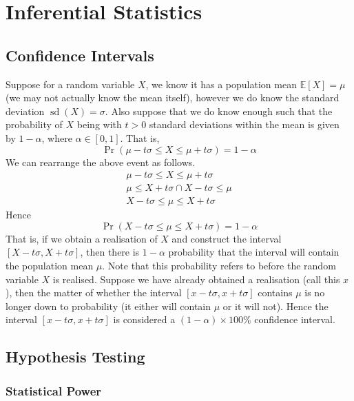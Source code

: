\documentclass[11pt]{report} %
\begin{document}
\section{Inferential Statistics}

\subsection{Confidence Intervals}

Suppose for a random variable $X$, we know it has a population mean $\mathbb{E}\left[X\right] = \mu$ (we may not actually know the mean itself), however we do know the standard deviation $\operatorname{sd}\left(X\right) = \sigma$. Also suppose that we do know enough such that the probability of $X$ being with $t > 0$ standard deviations within the mean is given by $1 - \alpha$, where $\alpha \in \left[0, 1\right]$. That is,
\begin{equation}
\operatorname{Pr}\left(\mu - t\sigma \leq X \leq \mu + t\sigma\right) = 1 - \alpha
\end{equation}
We can rearrange the above event as follows.
\begin{gather}
\mu - t\sigma \leq X \leq \mu + t\sigma \\
\mu \leq X + t\sigma \cap X - t\sigma \leq \mu \\
X - t\sigma \leq \mu \leq X + t\sigma
\end{gather}
Hence
\begin{equation}
\operatorname{Pr}\left(X - t\sigma \leq \mu \leq X + t\sigma\right) = 1 - \alpha
\end{equation}
That is, if we obtain a realisation of $X$ and construct the interval $\left[X - t\sigma, X + t\sigma\right]$, then there is $1 - \alpha$ probability that the interval will contain the population mean $\mu$. Note that this probability refers to before the random variable $X$ is realised. Suppose we have already obtained a realisation (call this $x$), then the matter of whether the interval 
$\left[x - t\sigma, x + t\sigma\right]$ contains $\mu$ is no longer down to probability (it either will contain $\mu$ or it will not). Hence the interval $\left[x - t\sigma, x + t\sigma\right]$ is considered a $\left(1 - \alpha\right)\times 100\%$ confidence interval.

\subsection{Hypothesis Testing}

\subsubsection{Statistical Power}
\end{document}
